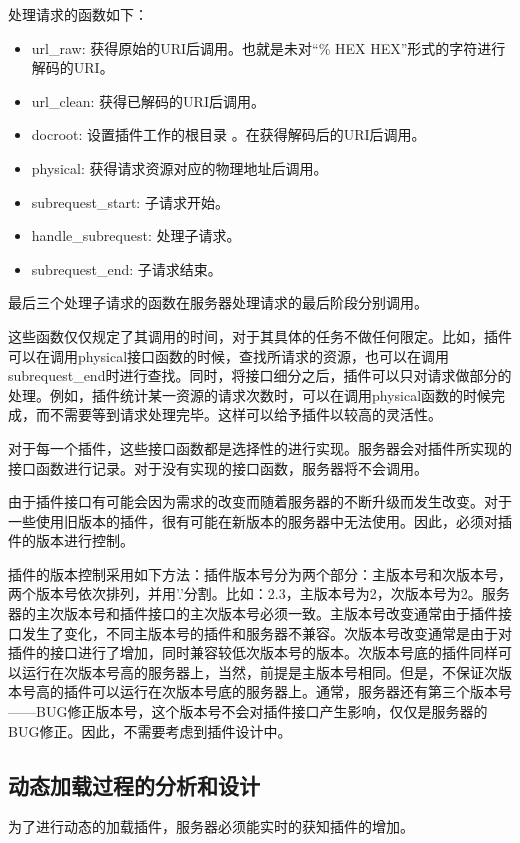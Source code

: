 \documentclass[12pt, twoside, a4paper, xetex]{report}
\begin{document}
	处理请求的函数如下：
	\begin{itemize}
		\item url\_raw: 获得原始的URI后调用。也就是未对“\% HEX HEX”形式的字符进行解码的URI。
		\item url\_clean: 获得已解码的URI后调用。
		\item docroot: 设置插件工作的根目录 。在获得解码后的URI后调用。
		\item physical: 获得请求资源对应的物理地址后调用。
		\item subrequest\_start: 子请求开始。
		\item handle\_subrequest: 处理子请求。
		\item subrequest\_end: 子请求结束。
	\end{itemize}
	
	最后三个处理子请求的函数在服务器处理请求的最后阶段分别调用。
	
	这些函数仅仅规定了其调用的时间，对于其具体的任务不做任何限定。比如，插件可以在调用physical接口函数的时候，查找所请求的资源，也可以在调用subrequest\_end时进行查找。同时，将接口细分之后，插件可以只对请求做部分的处理。例如，插件统计某一资源的请求次数时，可以在调用physical函数的时候完成，而不需要等到请求处理完毕。这样可以给予插件以较高的灵活性。
	
	对于每一个插件，这些接口函数都是选择性的进行实现。服务器会对插件所实现的接口函数进行记录。对于没有实现的接口函数，服务器将不会调用。
	
	由于插件接口有可能会因为需求的改变而随着服务器的不断升级而发生改变。对于一些使用旧版本的插件，很有可能在新版本的服务器中无法使用。因此，必须对插件的版本进行控制。
	
	插件的版本控制采用如下方法：插件版本号分为两个部分：主版本号和次版本号，两个版本号依次排列，并用'.'分割。比如：2.3，主版本号为2，次版本号为2。服务器的主次版本号和插件接口的主次版本号必须一致。主版本号改变通常由于插件接口发生了变化，不同主版本号的插件和服务器不兼容。次版本号改变通常是由于对插件的接口进行了增加，同时兼容较低次版本号的版本。次版本号底的插件同样可以运行在次版本号高的服务器上，当然，前提是主版本号相同。但是，不保证次版本号高的插件可以运行在次版本号底的服务器上。通常，服务器还有第三个版本号——BUG修正版本号，这个版本号不会对插件接口产生影响，仅仅是服务器的BUG修正。因此，不需要考虑到插件设计中。
	
\subsection{动态加载过程的分析和设计}
	为了进行动态的加载插件，服务器必须能实时的获知插件的增加。
	
\end{document}
